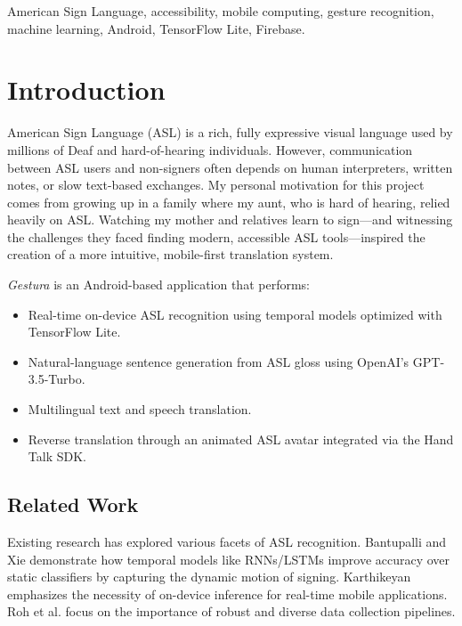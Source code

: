 \documentclass[conference]{IEEEtran}
\begin{document}
\begin{IEEEkeywords}
American Sign Language, accessibility, mobile computing, gesture recognition, machine learning, Android, TensorFlow Lite, Firebase.
\end{IEEEkeywords}

\tableofcontents

\section{Introduction}
American Sign Language (ASL) is a rich, fully expressive visual language used by millions of Deaf and hard-of-hearing individuals. However, communication between ASL users and non-signers often depends on human interpreters, written notes, or slow text-based exchanges. My personal motivation for this project comes from growing up in a family where my aunt, who is hard of hearing, relied heavily on ASL. Watching my mother and relatives learn to sign—and witnessing the challenges they faced finding modern, accessible ASL tools—inspired the creation of a more intuitive, mobile-first translation system.

\emph{Gestura} is an Android-based application that performs:
\begin{itemize}
    \item Real-time on-device ASL recognition using temporal models optimized with TensorFlow Lite.
    \item Natural-language sentence generation from ASL gloss using OpenAI's GPT-3.5-Turbo.
    \item Multilingual text and speech translation.
    \item Reverse translation through an animated ASL avatar integrated via the Hand Talk SDK.
\end{itemize}

\subsection{Related Work}
Existing research has explored various facets of ASL recognition. Bantupalli and Xie \cite{bantupalli2018asl} demonstrate how temporal models like RNNs/LSTMs improve accuracy over static classifiers by capturing the dynamic motion of signing. Karthikeyan \cite{karthikeyan2018mlmobile} emphasizes the necessity of on-device inference for real-time mobile applications. Roh et al. \cite{roh2021data} focus on the importance of robust and diverse data collection pipelines.
\end{document}
